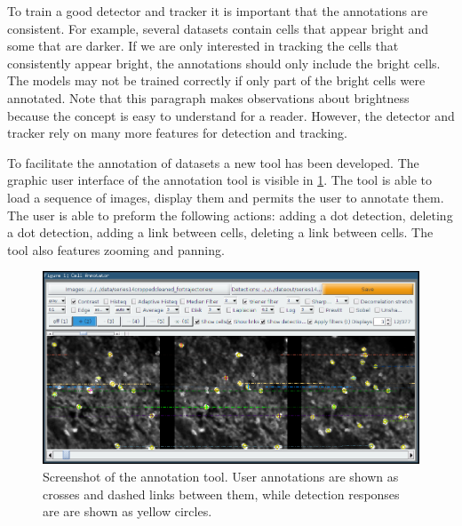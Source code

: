    	To train a good detector and tracker it is important that the annotations are consistent. For example, several datasets contain cells that appear bright and some that are darker. If we are only interested in tracking the cells that consistently appear bright, the annotations should only include the bright cells. The models may not be trained correctly if only part of the bright cells were annotated. Note that this paragraph makes observations about brightness because the concept is easy to understand for a reader. However, the detector and tracker rely on many more features for detection and tracking.
	
		To facilitate the annotation of datasets a new tool has been developed. The graphic user interface of the annotation tool is visible in \cref{fig:data_annotator_screenshot}. The tool is able to load a sequence of images, display them and permits the user to annotate them. The user is able to preform the following actions: adding a dot detection, deleting a dot detection, adding a link between cells, deleting a link between cells. The tool also features zooming and panning.
		

		\begin{figure}
			\includegraphics[width=\textwidth]{images/data_annotator_screenshot}
			\caption{Screenshot of the annotation tool. User annotations are shown as crosses and dashed links between them, while detection responses are are shown as yellow circles.}
			\label{fig:data_annotator_screenshot}
		\end{figure}
		
